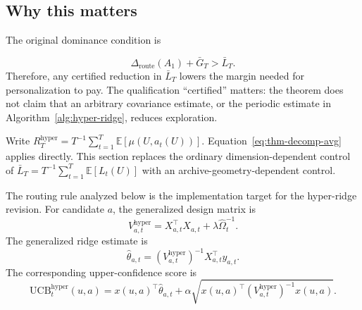 \documentclass{article} %
\providecommand{\Droute}{\Delta_{\mathrm{route}}}
\begin{document}
\subsection{Why this matters}

The original dominance condition is

\begin{equation}
\Droute(A_1) + \bar{G}_T > \bar{L}_T .
\end{equation}
Therefore, any certified reduction in $\bar L_T$ lowers the margin needed for
personalization to pay. The qualification ``certified'' matters: the theorem
does not claim that an arbitrary covariance estimate, or the periodic estimate
in Algorithm~\ref{alg:hyper-ridge}, reduces exploration.




Write
\(R_T^{\mathrm{hyper}}
=T^{-1}\sum_{t=1}^{T}\mathbb{E}[\mu(U,a_t(U))]\).
Equation~\eqref{eq:thm-decomp-avg} applies directly. This section replaces the
ordinary dimension-dependent control of
\(\bar L_T=T^{-1}\sum_{t=1}^{T}\mathbb{E}[L_t(U)]\)
with an archive-geometry-dependent control.

The routing rule analyzed below is the implementation target for the hyper-ridge revision. For candidate \(a\), the generalized design matrix is
\begin{equation}
\label{eq:hyper-design}
V_{a,t}^{\mathrm{hyper}}
=
X_{a,t}^{\top}X_{a,t}
+
\lambda \widehat{\Omega}_t^{-1}.
\end{equation}
The generalized ridge estimate is
\begin{equation}
\label{eq:hyper-theta-hat}
\widehat{\theta}_{a,t}
=
\left(V_{a,t}^{\mathrm{hyper}}\right)^{-1}
X_{a,t}^{\top}y_{a,t}.
\end{equation}
The corresponding upper-confidence score is
\begin{equation}
\label{eq:hyper-ucb}
\mathrm{UCB}_{t}^{\mathrm{hyper}}(u,a)
=
x(u,a)^{\top}\widehat{\theta}_{a,t}
+
\alpha
\sqrt{
x(u,a)^{\top}
\left(V_{a,t}^{\mathrm{hyper}}\right)^{-1}
x(u,a)
}.
\end{equation}
\end{document}
